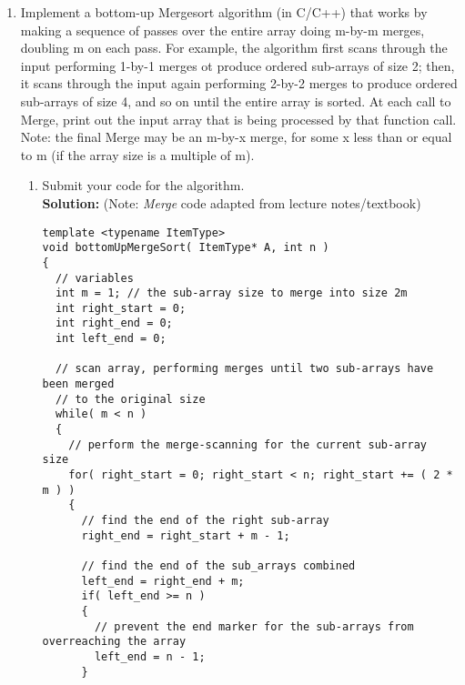 \documentclass[11pts]{article}
\begin{document}
\begin{enumerate}
\begin{enumerate}
  \end{enumerate}

\newpage
\item Implement a bottom-up Mergesort algorithm (in C/C++) that works by
      making a sequence of passes over the entire array doing m-by-m merges,
      doubling m on each pass. For example, the algorithm first scans
      through the input performing 1-by-1 merges ot produce ordered
      sub-arrays of size 2; then, it scans through the input again performing
      2-by-2 merges to produce ordered sub-arrays of size 4, and so on until
      the entire array is sorted. At each call to Merge, print out the input
      array that is being processed by that function call. Note: the final
      Merge may be an m-by-x merge, for some x less than or equal to m
      (if the array size is a multiple of m).

  \begin{enumerate}
  \item Submit your code for the algorithm. \\

  \textbf{Solution:} (Note: \textit{Merge} code adapted from
          lecture notes/textbook)
  \begin{verbatim}
template <typename ItemType>
void bottomUpMergeSort( ItemType* A, int n )
{
  // variables
  int m = 1; // the sub-array size to merge into size 2m
  int right_start = 0;
  int right_end = 0;
  int left_end = 0;

  // scan array, performing merges until two sub-arrays have been merged
  // to the original size
  while( m < n )
  {
    // perform the merge-scanning for the current sub-array size
    for( right_start = 0; right_start < n; right_start += ( 2 * m ) )
    {
      // find the end of the right sub-array
      right_end = right_start + m - 1;

      // find the end of the sub_arrays combined
      left_end = right_end + m;
      if( left_end >= n )
      {
        // prevent the end marker for the sub-arrays from overreaching the array
        left_end = n - 1;
      }


\end{verbatim}
\end{enumerate}
\end{enumerate}
\end{document}
